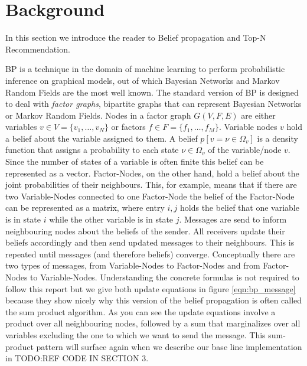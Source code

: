 \section{Background}\label{sec:background}

In this section we introduce the reader to Belief propagation and Top-N Recommendation.

BP is a technique in the domain of machine learning to perform probabilistic inference on graphical models, out of which Bayesian Networks and Mar\-kov Random Fields are the most well known. The standard version of BP is designed to deal with \textit{factor graphs}, bipartite graphs that can represent Bayesian Networks or Markov Random Fields. Nodes in a factor graph $G(V,F,E)$ are either variables $v \in V = \{ v_1, \ldots, v_N \}$ or factors $f \in F = \{f_1, \ldots, f_M \}$. Variable nodes $v$ hold a belief about the variable assigned to them. A belief $p[v=\nu\in\Omega_{v}]$ is a density function that assigns a probability to each state $\nu \in \Omega_v$ of the variable/node $v$. Since the number of states of a variable is often finite this belief can be represented as a vector. Factor-Nodes, on the other hand, hold a belief about the joint probabilities of their neighbours. This, for example, means that if there are two Variable-Nodes connected to one Factor-Node the belief of the Factor-Node can be represented as a matrix, where entry $i,j$ holds the belief that one variable is in state $i$ while the other variable is in state $j$. Messages are send to inform neighbouring nodes about the beliefs of the sender. All receivers update their beliefs accordingly and then send updated messages to their neighbours. This is repeated until messages (and therefore beliefs) converge. Conceptually there are two types of messages, from Variable-Nodes to Factor-Nodes and from Factor-Nodes to Variable-Nodes. Understanding the concrete formulas is not required to follow this report but we give both update equations in figure \ref{eqn:bp_message} because they show nicely why this version of the belief propagation is often called the sum product algorithm. As you can see the update equations involve a product over all neighbouring nodes, followed by a sum that marginalizes over all variables excluding the one to which we want to send the message. This sum-product pattern will surface again when we describe our base line implementation in TODO:REF CODE IN SECTION 3.

